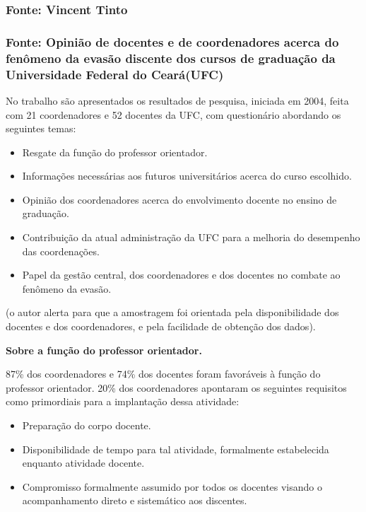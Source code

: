 \documentclass{report}
\begin{document}
\subsubsection{Fonte: Vincent Tinto}

\subsubsection{Fonte: Opinião de docentes e de coordenadores acerca do fenômeno da evasão discente dos cursos de graduação da Universidade Federal do Ceará(UFC)}

No trabalho \cite{andriola} são apresentados os resultados de pesquisa, iniciada em 2004, feita com 21 coordenadores e 52 docentes da UFC, com questionário abordando os seguintes temas:
\begin{itemize}
\item Resgate da função do professor orientador.
\item Informações necessárias aos futuros universitários acerca do curso escolhido.
\item Opinião dos coordenadores acerca do envolvimento docente no ensino de graduação.
\item Contribuição da atual administração da UFC para a melhoria do desempenho das coordenações.
\item Papel da gestão central, dos coordenadores e dos docentes no combate ao fenômeno da evasão.
\end{itemize}
(o autor alerta para que a amostragem foi orientada pela disponibilidade dos docentes e dos coordenadores, e pela facilidade de obtenção dos dados).

\textbf{Sobre a função do professor orientador.}

87\% dos coordenadores e 74\% dos docentes foram favoráveis à função do professor orientador. 20\% dos coordenadores apontaram os seguintes requisitos como primordiais para a implantação dessa atividade:

\begin{itemize}
\item Preparação do corpo docente.
\item Disponibilidade de tempo para tal atividade, formalmente estabelecida enquanto atividade docente.
\item Compromisso formalmente assumido por todos os docentes visando o acompanhamento direto e sistemático aos discentes.
\end{itemize}
\end{document}
